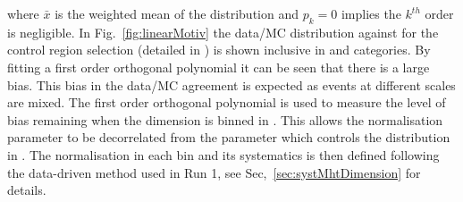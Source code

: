 where $\bar{x}$ is the weighted mean of the distribution and $p_k = 0$ 
implies the $k^{th}$ order is negligible.
In Fig.~\ref{fig:linearMotiv} the data/MC 
distribution against \mht for the control region selection 
(detailed in \cite{Khachatryan:2016pxa}) is shown inclusive 
in \scalht and categories. By fitting a first order
orthogonal polynomial it can be seen that there is a large bias. 
This bias in the data/MC agreement is expected as events 
at different scales are mixed.
The first order orthogonal polynomial
is used to measure the level of bias remaining 
when the \mht dimension is binned in \scalht.
This allows the normalisation parameter to be
decorrelated from the parameter which controls
the distribution in \mht.
The normalisation in each \scalht bin and its systematics 
is then defined following the data-driven method used in Run 1, see Sec,~\ref{sec:systMhtDimension} for details.
